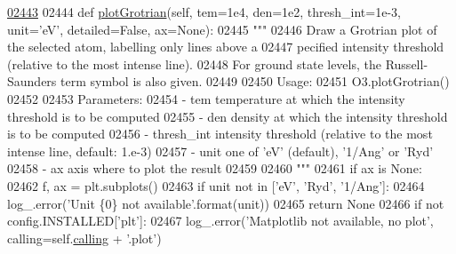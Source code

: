 \begin{DoxyCode}
\hypertarget{classpyneb_1_1core_1_1pynebcore_1_1_atom_l02443}{}\hyperlink{classpyneb_1_1core_1_1pynebcore_1_1_atom_ad18adec8faaf694fbff55656efea719d}{02443} 
02444     \textcolor{keyword}{def }\hyperlink{classpyneb_1_1core_1_1pynebcore_1_1_atom_ad18adec8faaf694fbff55656efea719d}{plotGrotrian}(self, tem=1e4, den=1e2, thresh\_int=1e-3, unit='eV', detailed=False, 
      ax=None):
02445         \textcolor{stringliteral}{"""}
02446 \textcolor{stringliteral}{        Draw a Grotrian plot of the selected atom, labelling only lines above a}
02447 \textcolor{stringliteral}{        pecified intensity threshold (relative to the most intense line). }
02448 \textcolor{stringliteral}{        For ground state levels, the Russell-Saunders term symbol is also given.}
02449 \textcolor{stringliteral}{        }
02450 \textcolor{stringliteral}{        Usage:}
02451 \textcolor{stringliteral}{            O3.plotGrotrian()}
02452 \textcolor{stringliteral}{        }
02453 \textcolor{stringliteral}{        Parameters:}
02454 \textcolor{stringliteral}{            - tem          temperature at which the intensity threshold is to be computed }
02455 \textcolor{stringliteral}{            - den          density at which the intensity threshold is to be computed }
02456 \textcolor{stringliteral}{            - thresh\_int   intensity threshold (relative to the most intense line, default: 1.e-3)}
02457 \textcolor{stringliteral}{            - unit         one of 'eV' (default), '1/Ang' or 'Ryd'}
02458 \textcolor{stringliteral}{            - ax           axis where to plot the result}
02459 \textcolor{stringliteral}{}
02460 \textcolor{stringliteral}{        """}
02461         \textcolor{keywordflow}{if} ax \textcolor{keywordflow}{is} \textcolor{keywordtype}{None}:
02462             f, ax = plt.subplots()
02463         \textcolor{keywordflow}{if} unit \textcolor{keywordflow}{not} \textcolor{keywordflow}{in} [\textcolor{stringliteral}{'eV'}, \textcolor{stringliteral}{'Ryd'}, \textcolor{stringliteral}{'1/Ang'}]:
02464             log\_.error(\textcolor{stringliteral}{'Unit \{0\} not available'}.format(unit))
02465             \textcolor{keywordflow}{return} \textcolor{keywordtype}{None}
02466         \textcolor{keywordflow}{if} \textcolor{keywordflow}{not} config.INSTALLED[\textcolor{stringliteral}{'plt'}]: 
02467             log\_.error(\textcolor{stringliteral}{'Matplotlib not available, no plot'}, calling=self.\hyperlink{classpyneb_1_1core_1_1pynebcore_1_1_atom_a373b7735acf4f528b54bddf373ad67a1}{calling} + \textcolor{stringliteral}{'.plot'})

\end{DoxyCode}
